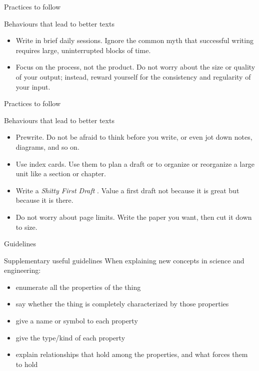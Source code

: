 \documentclass{beamer}
\begin{document}
\begin{frame}{Practices to follow}
\begin{block}{Behaviours that lead to better texts}
\begin{itemize}
\item Write in brief daily sessions. Ignore the common myth that successful writing requires large, uninterrupted blocks of time.
\item Focus on the process, not the product. Do not worry about the size or quality of your output; instead, reward yourself for the consistency and regularity of your input.
\end{itemize}
\end{block}
\end{frame}


\begin{frame}{Practices to follow}
\begin{block}{Behaviours that lead to better texts}
\begin{itemize}
\item Prewrite. Do not be afraid to think before you write, or even jot down notes, diagrams, and so on.
\item Use index cards. Use them to plan a draft or to organize or reorganize a large unit like a section or chapter.
\item Write a \textit{Shitty First Draft \texttrademark}. Value a first draft not because it is great but because it is there.
\item Do not worry about page limits. Write the paper you want, then cut it down to size.
\end{itemize}
\end{block}
\end{frame}


\begin{frame}{Guidelines}
\begin{block}{Supplementary useful guidelines}
When explaining new concepts in science and engineering:
\begin{itemize}
\item enumerate all the properties of the thing
\item say whether the thing is completely characterized by those properties
\item give a name or symbol to each property
\item give the type/kind of each property
\item explain relationships that hold among the properties, and what forces them to hold
\end{itemize}
\end{block}
\end{frame}
\end{document}
